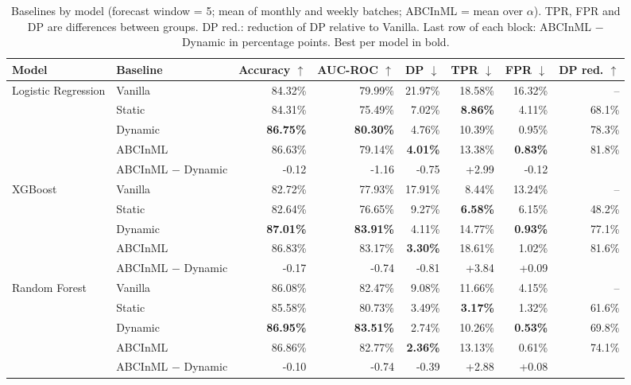 \begin{table}
  \small
  \caption{Baselines by model (forecast window = 5; mean of monthly and weekly batches; ABCInML = mean over $\alpha$). TPR, FPR and DP are differences between groups. DP red.: reduction of DP relative to Vanilla. Last row of each block: ABCInML $-$ Dynamic in percentage points. Best per model in bold.}
  \label{tab:baselines-models}
  \begin{tabular}{llrrrrrr}
    \toprule
    Model & Baseline & Accuracy $\uparrow$ & AUC-ROC $\uparrow$ & DP $\downarrow$ & TPR $\downarrow$ & FPR $\downarrow$ & DP red. $\uparrow$ \\
    \midrule
    Logistic Regression & Vanilla & 84.32\% & 79.99\% & 21.97\% & 18.58\% & 16.32\% & -- \\
     & Static & 84.31\% & 75.49\% & 7.02\% & \textbf{8.86\%} & 4.11\% & 68.1\% \\
     & Dynamic & \textbf{86.75\%} & \textbf{80.30\%} & 4.76\% & 10.39\% & 0.95\% & 78.3\% \\
     & ABCInML & 86.63\% & 79.14\% & \textbf{4.01\%} & 13.38\% & \textbf{0.83\%} & 81.8\% \\
     & ABCInML $-$ Dynamic & -0.12 & -1.16 & -0.75 & +2.99 & -0.12 & \\
    \midrule
    XGBoost & Vanilla & 82.72\% & 77.93\% & 17.91\% & 8.44\% & 13.24\% & -- \\
     & Static & 82.64\% & 76.65\% & 9.27\% & \textbf{6.58\%} & 6.15\% & 48.2\% \\
     & Dynamic & \textbf{87.01\%} & \textbf{83.91\%} & 4.11\% & 14.77\% & \textbf{0.93\%} & 77.1\% \\
     & ABCInML & 86.83\% & 83.17\% & \textbf{3.30\%} & 18.61\% & 1.02\% & 81.6\% \\
     & ABCInML $-$ Dynamic & -0.17 & -0.74 & -0.81 & +3.84 & +0.09 & \\
    \midrule
    Random Forest & Vanilla & 86.08\% & 82.47\% & 9.08\% & 11.66\% & 4.15\% & -- \\
     & Static & 85.58\% & 80.73\% & 3.49\% & \textbf{3.17\%} & 1.32\% & 61.6\% \\
     & Dynamic & \textbf{86.95\%} & \textbf{83.51\%} & 2.74\% & 10.26\% & \textbf{0.53\%} & 69.8\% \\
     & ABCInML & 86.86\% & 82.77\% & \textbf{2.36\%} & 13.13\% & 0.61\% & 74.1\% \\
     & ABCInML $-$ Dynamic & -0.10 & -0.74 & -0.39 & +2.88 & +0.08 & \\
    \bottomrule
  \end{tabular}
\end{table}

